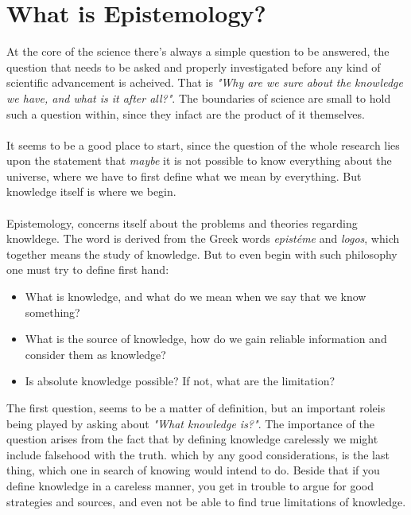 \documentclass[10pt,a4paper]{article}
\newcounter{theo}
\begin{document}
        \section{What is Epistemology?}
                \indent At the core of the science there's always a simple question to be answered, the question that needs to be asked and properly investigated before any kind of scientific advancement is acheived. That is \textit{"Why are we sure about the knowledge we have, and what is it after all?"}. The boundaries of science are small to hold such a question within, since they infact are the product of it themselves.
                \\
                \\
                It seems to be a good place to start, since the question of the whole research lies upon the statement that \textit{maybe} it is not possible to know everything about the universe, where we have to first define what we mean by everything. But knowledge itself is where we begin.
                \\
                \\
                \indent Epistemology, concerns itself about the problems and theories regarding knowldege. The word is derived from the Greek words \textit{epistéme} and \textit{logos}, which together means the study of knowledge. But to even begin with such philosophy one must try to define first hand:
                \begin{itemize}
                    \item What is knowledge, and what do we mean when we say that we know something?
                    \item What is the source of knowledge, how do we gain reliable information and consider them as knowledge?
                    \item Is absolute knowledge possible? If not, what are the limitation?\cite{CW/E}
                \end{itemize}
                \indent The first question, seems to be a matter of definition, but an important roleis being played by asking about \textit{"What knowledge is?"}. The importance of the question arises from the fact that by defining knowledge carelessly we might include falsehood with the truth. which by any good considerations, is the last thing, which one in search of knowing would intend to do. Beside that if you define knowledge in a careless manner, you get in trouble to argue for good strategies and sources, and even not be able to find true limitations of knowledge.
\end{document}
